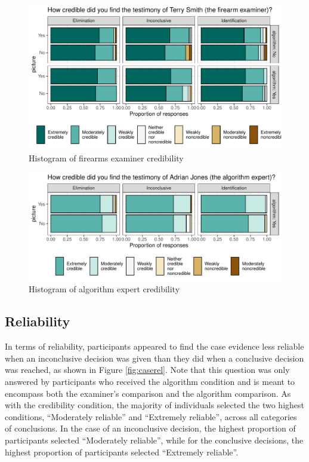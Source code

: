 \documentclass[print]{nuthesis}
\begin{document}
\begin{figure}

{\centering \includegraphics[width=\linewidth]{thesis_files/figure-latex/cred-1} 

}

\caption{Histogram of firearms examiner credibility}\label{fig:cred}
\end{figure}

\begin{figure}

{\centering \includegraphics[width=\linewidth]{thesis_files/figure-latex/algcred-1} 

}

\caption{Histogram of algorithm expert credibility}\label{fig:algcred}
\end{figure}

\hypertarget{reliability}{%
\subsection{Reliability}\label{reliability}}

In terms of reliability, participants appeared to find the case evidence less reliable when an inconclusive decision was given than they did when a conclusive decision was reached, as shown in Figure \ref{fig:caserel}.
Note that this question was only answered by participants who received the algorithm condition and is meant to encompass both the examiner's comparison and the algorithm comparison.
As with the credibility condition, the majority of individuals selected the two highest conditions, ``Moderately reliable'' and ``Extremely reliable'', across all categories of conclusions.
In the case of an inconclusive decision, the highest proportion of participants selected ``Moderately reliable'', while for the conclusive decisions, the highest proportion of participants selected ``Extremely reliable''.
\end{document}
